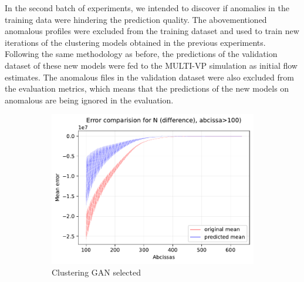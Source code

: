 In the second batch of experiments, we intended to discover if anomalies in the training data were hindering the prediction quality. The abovementioned anomalous profiles were excluded from the training dataset and used to train new iterations of the clustering models obtained in the previous experiments. Following the same methodology as before, the predictions of the validation dataset of these new models were fed to the MULTI-VP simulation as initial flow estimates. The anomalous files in the validation dataset were also excluded from the evaluation metrics, which means that the predictions of the new models on anomalous are being ignored in the evaluation.


\begin{figure}[h]
    \caption[Clustering and GAN MULTI-VP error comparison for N]{Error comparison of $n [cm^3]$. \emph{(a)} shows the mean error comparison of the results from the previous clustering experiments (without anomalous profiles) and the expert estimates; \emph{(b)} is the mean error comparison of the clustering models trained on datasets without anomalies and the original expert estimates.} 
    \begin{subfigure}[]{0.48\textwidth}
        \centering
        \includegraphics[width=\textwidth]{figures/N_error_comparison_after100_clusters_gan_selected.pdf}
        \caption{Clustering GAN selected}
        \label{fig:n_clusters_gan_selected}
    \end{subfigure}
    \hfill
    \begin{subfigure}[]{0.48\textwidth}
        \centering

\end{subfigure}
\end{figure}
